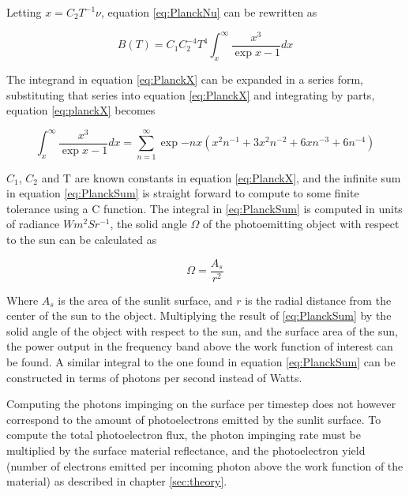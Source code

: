 Letting $x = C_2 T^{-1} \nu$, equation \ref{eq:PlanckNu} can be rewritten as 

\begin{equation}\label{eq:PlanckX}
    B(T) = C_1 C_2^{-4} T^4 \int^{\infty}_x \frac{x^3}{\exp{x} - 1} dx
\end{equation}

The integrand in equation \ref{eq:PlanckX} can be expanded in a series form, substituting that series into equation \ref{eq:PlanckX} and integrating by parts, equation \ref{eq:planckX} becomes

\begin{equation}\label{eq:PlanckSum}
    \int^{\infty}_x \frac{x^3}{\exp{x} - 1} dx = \sum^{\infty}_{n=1} \exp{-n x} \left(x^2 n^{-1} + 3 x^2 n^{-2} + 6 x n^{-3} + 6 n^{-4} \right)
\end{equation}

$C_1$, $C_2$ and T are known constants in equation \ref{eq:PlanckX}, and the infinite sum in equation \ref{eq:PlanckSum} is straight forward to compute to some finite tolerance using a C function. The integral in \ref{eq:PlanckSum} is computed in units of radiance $W m^2 Sr^{-1}$, the solid angle $\Omega$ of the photoemitting object with respect to the sun can be calculated as

\begin{equation*}
    \Omega = \frac{A_s}{r^2}
\end{equation*}

Where $A_s$ is the area of the sunlit surface, and $r$ is the radial distance from the center of the sun to the object. Multiplying the result of \ref{eq:PlanckSum} by the solid angle of the object with respect to the sun, and the surface area of the sun, the power output in the frequency band above the work function of interest can be found. A similar integral to the one found in equation \ref{eq:PlanckSum} can be constructed in terms of photons per second instead of Watts.

Computing the photons impinging on the surface per timestep does not however correspond to the amount of photoelectrons emitted by the sunlit surface. To compute the total photoelectron flux, the photon impinging rate must be multiplied by the surface material reflectance, and the photoelectron yield (number of electrons emitted per incoming photon above the work function of the material) as described in chapter \ref{sec:theory}.


